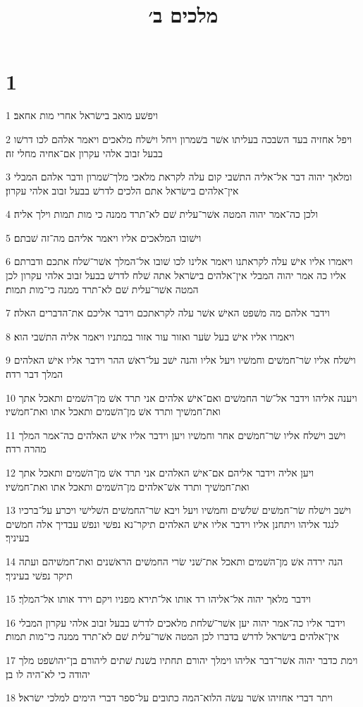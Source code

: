 

\title{מלכים ב׳}


\chapter{1}

\par 1 ויפשׁע מואב בישׂראל אחרי מות אחאב׃
\par 2 ויפל אחזיה בעד השׂבכה בעליתו אשׁר בשׁמרון ויחל וישׁלח מלאכים ויאמר אלהם לכו דרשׁו בבעל זבוב אלהי עקרון אם־אחיה מחלי זה׃
\par 3 ומלאך יהוה דבר אל־אליה התשׁבי קום עלה לקראת מלאכי מלך־שׁמרון ודבר אלהם המבלי אין־אלהים בישׂראל אתם הלכים לדרשׁ בבעל זבוב אלהי עקרון׃
\par 4 ולכן כה־אמר יהוה המטה אשׁר־עלית שׁם לא־תרד ממנה כי מות תמות וילך אליה׃
\par 5 וישׁובו המלאכים אליו ויאמר אליהם מה־זה שׁבתם׃
\par 6 ויאמרו אליו אישׁ עלה לקראתנו ויאמר אלינו לכו שׁובו אל־המלך אשׁר־שׁלח אתכם ודברתם אליו כה אמר יהוה המבלי אין־אלהים בישׂראל אתה שׁלח לדרשׁ בבעל זבוב אלהי עקרון לכן המטה אשׁר־עלית שׁם לא־תרד ממנה כי־מות תמות׃
\par 7 וידבר אלהם מה משׁפט האישׁ אשׁר עלה לקראתכם וידבר אליכם את־הדברים האלה׃
\par 8 ויאמרו אליו אישׁ בעל שׂער ואזור עור אזור במתניו ויאמר אליה התשׁבי הוא׃
\par 9 וישׁלח אליו שׂר־חמשׁים וחמשׁיו ויעל אליו והנה ישׁב על־ראשׁ ההר וידבר אליו אישׁ האלהים המלך דבר רדה׃
\par 10 ויענה אליהו וידבר אל־שׂר החמשׁים ואם־אישׁ אלהים אני תרד אשׁ מן־השׁמים ותאכל אתך ואת־חמשׁיך ותרד אשׁ מן־השׁמים ותאכל אתו ואת־חמשׁיו׃
\par 11 וישׁב וישׁלח אליו שׂר־חמשׁים אחר וחמשׁיו ויען וידבר אליו אישׁ האלהים כה־אמר המלך מהרה רדה׃
\par 12 ויען אליה וידבר אליהם אם־אישׁ האלהים אני תרד אשׁ מן־השׁמים ותאכל אתך ואת־חמשׁיך ותרד אשׁ־אלהים מן־השׁמים ותאכל אתו ואת־חמשׁיו׃
\par 13 וישׁב וישׁלח שׂר־חמשׁים שׁלשׁים וחמשׁיו ויעל ויבא שׂר־החמשׁים השׁלישׁי ויכרע על־ברכיו לנגד אליהו ויתחנן אליו וידבר אליו אישׁ האלהים תיקר־נא נפשׁי ונפשׁ עבדיך אלה חמשׁים בעיניך׃
\par 14 הנה ירדה אשׁ מן־השׁמים ותאכל את־שׁני שׂרי החמשׁים הראשׁנים ואת־חמשׁיהם ועתה תיקר נפשׁי בעיניך׃
\par 15 וידבר מלאך יהוה אל־אליהו רד אותו אל־תירא מפניו ויקם וירד אותו אל־המלך׃
\par 16 וידבר אליו כה־אמר יהוה יען אשׁר־שׁלחת מלאכים לדרשׁ בבעל זבוב אלהי עקרון המבלי אין־אלהים בישׂראל לדרשׁ בדברו לכן המטה אשׁר־עלית שׁם לא־תרד ממנה כי־מות תמות׃
\par 17 וימת כדבר יהוה אשׁר־דבר אליהו וימלך יהורם תחתיו בשׁנת שׁתים ליהורם בן־יהושׁפט מלך יהודה כי לא־היה לו בן׃
\par 18 ויתר דברי אחזיהו אשׁר עשׂה הלוא־המה כתובים על־ספר דברי הימים למלכי ישׂראל׃

